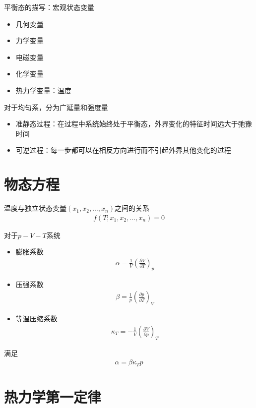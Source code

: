 平衡态的描写：宏观状态变量
\begin{itemize}
    \item 几何变量
    \item 力学变量
    \item 电磁变量
    \item 化学变量
    \item 热力学变量：温度
\end{itemize}
对于均匀系，分为广延量和强度量

\begin{itemize}
    \item 准静态过程：在过程中系统始终处于平衡态，外界变化的特征时间远大于弛豫时间
    \item 可逆过程：每一步都可以在相反方向进行而不引起外界其他变化的过程
\end{itemize}

\section{物态方程}

温度与独立状态变量$(x_1, x_2, \ldots, x_n)$之间的关系
\begin{gather*}
    f(T; x_1, x_2, \ldots, x_n) = 0
\end{gather*}

对于$p-V-T$系统
\begin{itemize}
    \item 膨胀系数
    \begin{gather*}
        \alpha = \frac{1}{V} \left( \frac{\partial V}{\partial T} \right)_p
    \end{gather*}
    \item 压强系数
    \begin{gather*}
        \beta = \frac{1}{p} \left( \frac{\partial p}{\partial T} \right)_V
    \end{gather*}
    \item 等温压缩系数
    \begin{gather*}
        \kappa_T = -\frac{1}{V} \left( \frac{\partial V}{\partial p} \right)_T
    \end{gather*}
\end{itemize}
满足
\begin{gather*}
    \alpha = \beta \kappa_T p
\end{gather*}

\section{热力学第一定律}

